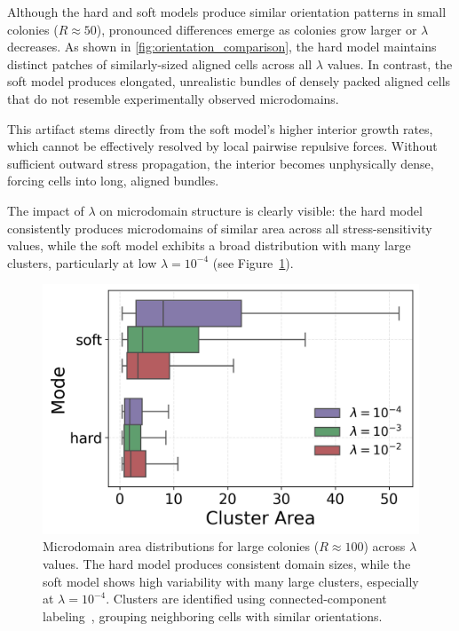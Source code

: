 \documentclass[conference]{IEEEtran}
\begin{document}
Although the hard and soft models produce similar orientation patterns in small colonies ($R \approx 50$), pronounced differences emerge as colonies grow larger or $\lambda$ decreases. As shown in \autoref{fig:orientation_comparison}, the hard model maintains distinct patches of similarly-sized aligned cells across all $\lambda$ values. In contrast, the soft model produces elongated, unrealistic bundles of densely packed aligned cells that do not resemble experimentally observed microdomains.

This artifact stems directly from the soft model's higher interior growth rates, which cannot be effectively resolved by local pairwise repulsive forces. Without sufficient outward stress propagation, the interior becomes unphysically dense, forcing cells into long, aligned bundles.

The impact of $\lambda$ on microdomain structure is clearly visible: the hard model consistently produces microdomains of similar area across all stress-sensitivity values, while the soft model exhibits a broad distribution with many large clusters, particularly at low $\lambda = 10^{-4}$ (see Figure~\ref{fig:cluster_area_boxplot}).

\begin{figure}[h]
    \centering
    \includegraphics[width=\linewidth]{figures/comparison_plots/cluster_area_boxplot.png}
    \caption{Microdomain area distributions for large colonies ($R \approx 100$) across $\lambda$ values. The hard model produces consistent domain sizes, while the soft model shows high variability with many large clusters, especially at $\lambda = 10^{-4}$. Clusters are identified using connected-component labeling~\cite{You2018}, grouping neighboring cells with similar orientations.}
    \label{fig:cluster_area_boxplot}
\end{figure}
\end{document}
